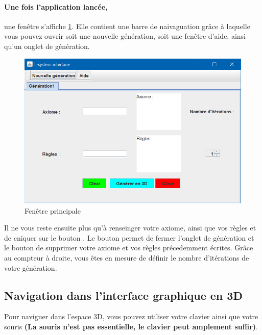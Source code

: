 \paragraph{Une fois l'application lancée,} une fenêtre s'affiche \ref{mainframe}. Elle contient une barre de naivaguation grâce à laquelle vous pouvez ouvrir soit une nouvelle génération, soit une fenêtre d'aide, ainsi qu'un onglet de génération.
\begin{figure}[h!]
    \centering
    \includegraphics[scale=0.5]{pics/MainFrameGUI.PNG}
    \caption{Fenêtre principale}
    \label{mainframe}
\end{figure}
Il ne vous reste ensuite plus qu'à renseinger votre axiome, ainsi que vos règles et de cniquer sur le bouton . Le bouton  permet de fermer l'onglet de génération et le bouton  de supprimer votre axiome et vos règles précedemment écrites. Grâce au compteur à droite, vous êtes en mesure de définir le nombre d'itérations de votre génération.


\subsection{Navigation dans l'interface graphique en 3D}

Pour naviguer dans l'espace 3D, vous pouvez utiliser votre clavier ainsi que votre souris \textbf{(La souris n'est pas essentielle, le clavier peut amplement suffir)}.

